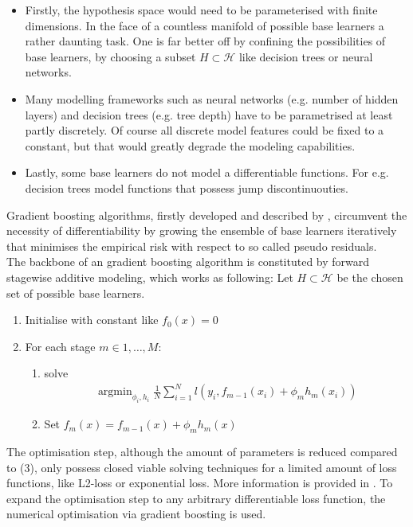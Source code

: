 \documentclass[a4paper, 11pt]{article}
\DeclareMathOperator*{\argmin}{argmin} %
\begin{document}
\begin{itemize}
\item Firstly, the hypothesis space would need to be parameterised with finite dimensions. In the face of a countless manifold of possible base learners a rather daunting task. One is far better off by confining the possibilities of base learners, by choosing a subset $H \subset \mathcal{H}$ like decision trees or neural networks.

\item Many modelling frameworks such as neural networks (e.g. number of hidden layers) and decision trees (e.g. tree depth) have to be parametrised at least partly discretely. Of course all discrete model features could be fixed to a constant, but that would greatly degrade the modeling capabilities.

\item Lastly, some base learners do not model a differentiable functions. For e.g. decision trees model functions that possess jump discontinuouties.
\end{itemize}

Gradient boosting algorithms, firstly developed and described by \cite{freund1997decision, friedman2001greedy, friedman2002stochastic}, circumvent the necessity of differentiability by growing the ensemble of base learners iteratively that minimises the empirical risk with respect to so called pseudo residuals.\\

The backbone of an gradient boosting algorithm is constituted by forward stagewise additive modeling, which works as following:
Let $H \subset \mathcal{H}$ be the chosen set of possible base learners.
\begin{enumerate}
\item Initialise with constant like $f_0(x) = 0$
\item For each stage $m \in 1,\ldots,M$:
\begin{enumerate}
\item solve \begin{align*}
\argmin_{\phi_i, h_i}\frac{1}{N}\sum_{i = 1}^{N} l(y_i,f_{m-1}(x_i) + \phi_m h_m(x_i))
\end{align*}
\item Set $f_m(x) = f_{m-1}(x) + \phi_m h_m(x)$
\end{enumerate}
\end{enumerate}

The optimisation step, although the amount of parameters is reduced compared to (3), only possess closed viable solving techniques for a limited amount of loss functions, like L2-loss or exponential loss. More information is provided in \cite{friedman2000additive}. To expand the optimisation step to any arbitrary differentiable loss function, the numerical optimisation via gradient boosting is used. \\
\end{document}
